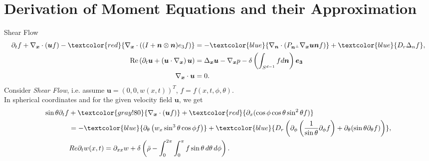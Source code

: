 \section{Derivation of Moment Equations and their Approximation}

\begin{frame}{Shear Flow}
	\scriptsize
	\begin{align*}
		\partial_t f+ \nabla_{\boldsymbol{x}} \cdot(\boldsymbol{u} f) -\textcolor{red}{\nabla_{\boldsymbol{x}} \cdot\left((I+\boldsymbol{n} \otimes \boldsymbol{n}) e_3 f\right)}  &= -\textcolor{blue}{\nabla_{\boldsymbol{n}} \cdot\left(P_{\boldsymbol{n}^{\perp}} \nabla_{\boldsymbol{x}} \boldsymbol{u} \boldsymbol{n} f\right)} + \textcolor{blue}{D_r \Delta_n f}\label{SmochEq_kurz}, \\
		\operatorname{Re}\left(\partial_t \boldsymbol{u}+\left(\boldsymbol{u} \cdot \nabla_{\boldsymbol{x}}\right) \boldsymbol{u}\right) & =\Delta_{\boldsymbol{x}} \boldsymbol{u}-\nabla_{\boldsymbol{x}} p-\delta \left(\int_{S^{d-1}} f d \boldsymbol{n} \right) \boldsymbol{e_3} \\
		\nabla_{\boldsymbol{x}} \cdot \boldsymbol{u} & =0.
	\end{align*}
	Consider \textit{Shear Flow}, i.e. assume $	\boldsymbol{u} = (0,0,w(x,t))^T$, $f=f(x,t,\phi,\theta)$. \\
	\vspace{3mm}
	\pause
	In spherical coordinates and for the given velocity field $\boldsymbol{u}$, we get
	\begin{equation}
		\begin{aligned}
			\sin\theta \partial_{t}f & + \textcolor{gray!80}{\nabla_{\boldsymbol{x}} \cdot(\boldsymbol{u} f)} + \textcolor{red}{\partial_x (\cos\phi \cos\theta \sin^2\theta f)} \\
			&= - \textcolor{blue}{\partial_\theta \left(w_x \sin^3 \theta \cos \phi f\right)} + \textcolor{blue}{D_{r} \left( \partial_\phi \left(\frac{1}{\sin \theta} \partial_\phi f \right) + \partial_\theta (\sin \theta \partial_\theta f) \right)}, \\
			& Re \partial_{t}w(x,t) = \partial_{xx}w + \delta \left( \bar{\rho} - \int_{0}^{2\pi} \int_{0}^{\pi} f \sin \theta \, d\theta \, d\phi \right). \label{SmochEq_wx}
		\end{aligned}
	\end{equation}
\end{frame}

